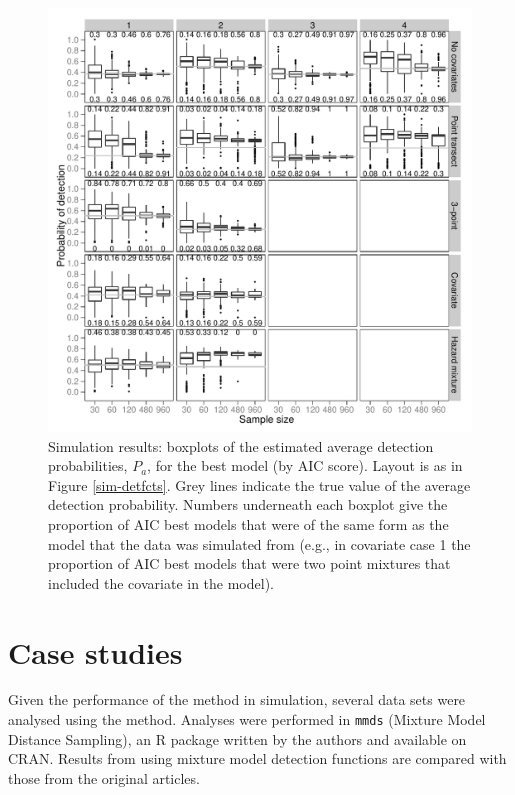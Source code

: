 \documentclass[useAMS,referee]{biom}
\begin{document}
\begin{figure}
\centering
\includegraphics[width=\textwidth]{simulations/pa-plot.pdf}
\caption{Simulation results: boxplots of the estimated average detection probabilities, $P_a$, for the best model (by AIC score). Layout is as in Figure \ref{sim-detfcts}. Grey lines indicate the true value of the average detection probability. Numbers underneath each boxplot give the proportion of AIC best models that were of the same form as the model that the data was simulated from (e.g., in covariate case 1 the proportion of AIC best models that were two point mixtures that included the covariate in the model).}
\label{sim-boxplots}
\end{figure}


\section{Case studies}
\label{s:data}

Given the performance of the method in simulation, several data sets were analysed using the method. Analyses were performed in \texttt{mmds} (Mixture Model Distance Sampling), an \textsf{R} package written by the authors and available on CRAN. Results from using mixture model detection functions are compared with those from the original articles.
\end{document}
